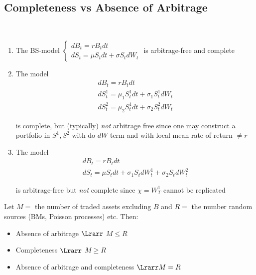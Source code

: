 \subsection{Completeness vs Absence of Arbitrage}\hfill\\
\begin{enumerate}[leftmargin=*]
  \item The BS-model $\begin{cases}
    dB_t = rB_tdt\\ dS_t = \mu S_tdt+\sigma S_tdW_t
    \end{cases}$ is arbitrage-free and complete
    \par\bigskip
  \item The model 
    \begin{equation*}
      \begin{gathered}
        dB_t = rB_tdt\\
        dS_t^1  = \mu_1S_t^1dt+\sigma_1S_t^1dW_t\\
        dS_t^2=\mu_2S_t^1dt+\sigma_2S_t^2dW_t
      \end{gathered}
    \end{equation*}\par
    \noindent is complete, but (typically) \textit{not} arbitrage free since one may construct a portfolio in $S^1,S^2$ with do $dW$ term and with local mean rate of return $\neq r$
    \par\bigskip
  \item The model
    \begin{equation*}
      \begin{gathered}
        dB_t = rB_tdt\\
        dS_t = \mu S_tdt+\sigma_1S_tdW_t^1+\sigma_2S_tdW_t^2
      \end{gathered}
    \end{equation*}\par
    \noindent is arbitrage-free but \textit{not} complete since $\chi = W_T^1$ cannot be replicated
\end{enumerate}
\par\bigskip
\begin{theo}{}
  Let $M = $ the number of traded assets excluding $B$ and $R = $ the number random sources (BMs, Poisson processes) etc. Then:\par
  \begin{itemize}
    \item Absence of arbitrage $\Lrarr$ $M\leq R$
    \item Completeness $\Lrarr$ $M\geq R$
    \item Absence of arbitrage and completeness $\Lrarr M=R$
  \end{itemize}
\end{theo}
